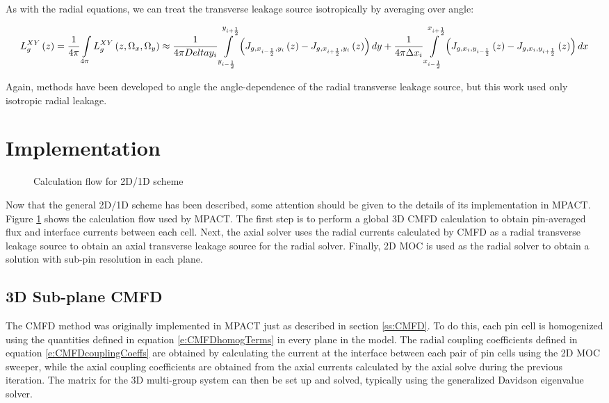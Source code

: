 As with the radial equations, we can treat the transverse leakage source isotropically by averaging over angle:

\begin{dmath}
{L_{g}^{XY}\left(z\right)} = {\frac{1}{4\pi}\intop_{4\pi} L_{g}^{XY}\left(z,\Omega_x,\Omega_y\right)} \approx {\frac{1}{4\pi\\Delta y_i}\intop_{y_{i-\frac{1}{2}}}^{y_{i+\frac{1}{2}}}\left( J_{g,x_{i-\frac{1}{2}},y_i}\left(z\right) - J_{g,x_{i+\frac{1}{2}},y_i}\left(z\right)\right)dy} + {\frac{1}{4\pi\Delta x_i}\intop_{x_{i-\frac{1}{2}}}^{x_{i+\frac{1}{2}}}\left( J_{g,x_i,y_{i-\frac{1}{2}}}\left(z\right) - J_{g,x_i,y_{i+\frac{1}{2}}}\left(z\right)\right)dx}
\end{dmath}

Again, methods have been developed to angle the angle-dependence of the radial transverse leakage source, but this work used only isotropic radial leakage.

\section{Implementation}

\begin{figure}[h]
  \centering
  
  \caption{Calculation flow for 2D/1D scheme}\label{f:2d1d-flowchart}
\end{figure}

Now that the general 2D/1D scheme has been described, some attention should be given to the details of its implementation in MPACT.  Figure \ref{f:2d1d-flowchart} shows the calculation flow used by MPACT.  The first step is to perform a global 3D CMFD calculation to obtain pin-averaged flux and interface currents between each cell.  Next, the axial solver uses the radial currents calculated by CMFD as a radial transverse leakage source to obtain an axial transverse leakage source for the radial solver.  Finally, 2D MOC is used as the radial solver to obtain a solution with sub-pin resolution in each plane.

\subsection{3D Sub-plane CMFD}

The CMFD method was originally implemented in MPACT just as described in section \ref{ss:CMFD}.  To do this, each pin cell is homogenized using the quantities defined in equation \ref{e:CMFDhomogTerms} in every plane in the model.  The radial coupling coefficients defined in equation \ref{e:CMFDcouplingCoeffs} are obtained by calculating the current at the interface between each pair of pin cells using the 2D MOC sweeper, while the axial coupling coefficients are obtained from the axial currents calculated by the axial solve during the previous iteration.  The matrix for the 3D multi-group system can then be set up and solved, typically using the generalized Davidson eigenvalue solver.

